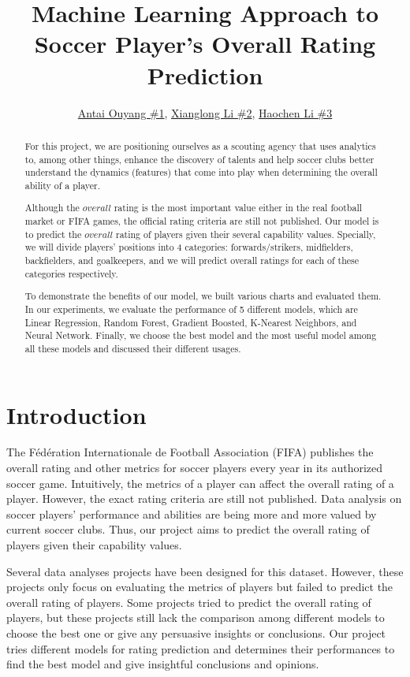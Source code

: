 \documentclass{article}
\title{Machine Learning Approach to Soccer Player's Overall Rating Prediction}
\author{\href{mailto:ao2186@nyu.edu}{Antai Ouyang \#1}, \href{mailto:xl3215@nyu.edu}{Xianglong Li \#2}, \href{mailto:hl4151@nyu.edu}{Haochen Li \#3}}
\date{\vspace{-5ex}} %
\begin{document}
\maketitle
\thispagestyle{firstpage}


\begin{abstract}
    
    
    For this project, we are positioning ourselves as a scouting agency that uses analytics to, among other things, enhance the discovery of talents and help soccer clubs better understand the dynamics (features) that come into play when determining the overall ability of a player. 
    
    Although the $overall$ rating is the most important value either in the real football market or FIFA games, the official rating criteria are still not published. Our model is to predict the $overall$ rating of players given their several capability values. Specially, we will divide players' positions into 4 categories: forwards/strikers, midfielders, backfielders, and goalkeepers, and we will predict overall ratings for each of these categories respectively.
    
    To demonstrate the benefits of our model, we built various charts and evaluated them. In our experiments, we evaluate the performance of 5 different models, which are Linear Regression, Random Forest, Gradient Boosted, K-Nearest Neighbors, and Neural Network. Finally, we choose the best model and the most useful model among all these models and discussed their different usages.
    
\end{abstract}


\section*{Introduction}
The Fédération Internationale de Football Association (FIFA) publishes the overall rating and other metrics for soccer players every year in its authorized soccer game. Intuitively, the metrics of a player can affect the overall rating of a player. However, the exact rating criteria are still not published. Data analysis on soccer players' performance and abilities are being more and more valued by current soccer clubs. Thus, our project aims to predict the overall rating of players given their capability values.

Several data analyses projects have been designed for this dataset. However, these projects only focus on evaluating the metrics of players but failed to predict
the overall rating of players. Some projects tried to predict the overall rating of players, but these projects still lack the comparison among different models
to choose the best one or give any persuasive insights or conclusions. Our project tries different models for rating prediction and determines their performances to find the best model and give insightful conclusions and opinions.
\end{document}
